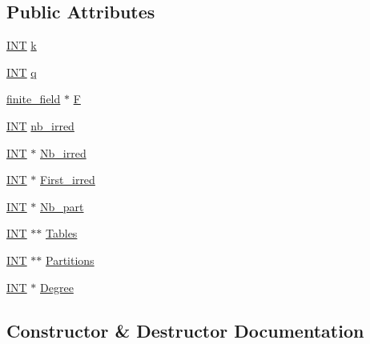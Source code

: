 \subsection*{Public Attributes}
\begin{DoxyCompactItemize}
\item 
\mbox{\hyperlink{galois_8h_a09fddde158a3a20bd2dcadb609de11dc}{I\+NT}} \mbox{\hyperlink{classgl__classes_af4e96aca00c946d04d95df712203c866}{k}}
\item 
\mbox{\hyperlink{galois_8h_a09fddde158a3a20bd2dcadb609de11dc}{I\+NT}} \mbox{\hyperlink{classgl__classes_a9e7717abc4a20f926404ca28268d71a6}{q}}
\item 
\mbox{\hyperlink{classfinite__field}{finite\+\_\+field}} $\ast$ \mbox{\hyperlink{classgl__classes_a488ed3305aee4f953b86c06a26031df6}{F}}
\item 
\mbox{\hyperlink{galois_8h_a09fddde158a3a20bd2dcadb609de11dc}{I\+NT}} \mbox{\hyperlink{classgl__classes_a4c814e0087e10d2d5b2912c238c449aa}{nb\+\_\+irred}}
\item 
\mbox{\hyperlink{galois_8h_a09fddde158a3a20bd2dcadb609de11dc}{I\+NT}} $\ast$ \mbox{\hyperlink{classgl__classes_a1b4152a9c2d4743c249cf58d6d97a26b}{Nb\+\_\+irred}}
\item 
\mbox{\hyperlink{galois_8h_a09fddde158a3a20bd2dcadb609de11dc}{I\+NT}} $\ast$ \mbox{\hyperlink{classgl__classes_ab092b4bd1149c3893b2acbb5d11d29b9}{First\+\_\+irred}}
\item 
\mbox{\hyperlink{galois_8h_a09fddde158a3a20bd2dcadb609de11dc}{I\+NT}} $\ast$ \mbox{\hyperlink{classgl__classes_a31cf0338c37feaf3b36b46fbe43f1e9a}{Nb\+\_\+part}}
\item 
\mbox{\hyperlink{galois_8h_a09fddde158a3a20bd2dcadb609de11dc}{I\+NT}} $\ast$$\ast$ \mbox{\hyperlink{classgl__classes_a523ac61440134f7a69f9d57e5dcb565b}{Tables}}
\item 
\mbox{\hyperlink{galois_8h_a09fddde158a3a20bd2dcadb609de11dc}{I\+NT}} $\ast$$\ast$ \mbox{\hyperlink{classgl__classes_a50fb658f5e496072a11f591176c0bee2}{Partitions}}
\item 
\mbox{\hyperlink{galois_8h_a09fddde158a3a20bd2dcadb609de11dc}{I\+NT}} $\ast$ \mbox{\hyperlink{classgl__classes_ac38251565bab5ac8ea95d0e4eb0a457d}{Degree}}
\end{DoxyCompactItemize}


\subsection{Constructor \& Destructor Documentation}
\mbox{\label{classgl__classes_ac6ab5dbcb31ce0511563d9791b3db172}} 
